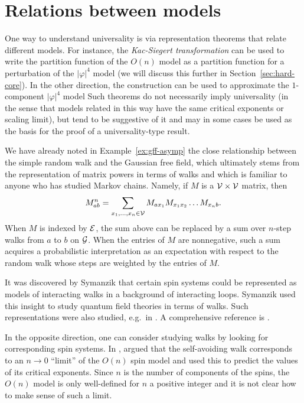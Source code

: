 \section{Relations between models}
\label{sec:spin-walk}

One way to understand universality is via representation theorems that relate
different models. For instance, the \emph{Kac-Siegert transformation}
can be used to write the partition function of the $O(n)$ model as a partition function
for a perturbation of the $|\varphi|^4$ model (we will discuss this further in
Section~\ref{sec:hard-core}). In the other direction, the
 construction \cite{SG73} can be used to approximate the $1$-component
$|\varphi|^4$ model 
Such theorems do not necessarily imply universality
(in the sense that models related in this way have the same critical exponents or
scaling limit), but tend to be suggestive of it and may in some cases
be used as the basis for the proof of a universality-type result.

We have already noted in Example~\ref{ex:gff-asymp} the close relationship between
the simple random walk
and the Gaussian free field, which ultimately stems from the representation of
matrix powers in terms of walks and which is familiar to anyone
who has studied Markov chains. Namely, if $M$ is a $\mathcal{V}\times\mathcal{V}$
matrix, then
\begin{equation}
M^n_{ab} = \sum_{x_1,\ldots,x_n\in\mathcal{V}} M_{ax_1} M_{x_1x_2} \ldots M_{x_nb}.
\end{equation}
When $M$ is indexed by $\mathcal{E}$, the
sum above can be replaced by a sum over $n$-step walks from $a$ to $b$ on $\mathcal{G}$.
When the entries of $M$ are nonnegative, such a sum acquires a probabilistic
interpretation as an expectation with respect to the random walk whose steps
are weighted by the entries of $M$.

It was discovered by Symanzik \cite{Syma69} that certain spin systems could be
represented as models of interacting walks in a background of interacting loops.
Symanzik used this insight to study quantum field theories in terms of walks.
Such representations were also studied, e.g.\ in \cite{BFS82,Dynk83}. A comprehensive
reference is \cite{FFS92}.

In the opposite direction, one can consider studying walks by looking for corresponding
spin systems. In \cite{Genn72},  argued that the self-avoiding walk
corresponds to an $n \to 0$ ``limit'' of the $O(n)$ spin model and used this
to predict the values of its critical exponents. Since $n$ is
the number of components of the spins, the $O(n)$ model is only well-defined
for $n$ a positive integer and it is not clear how to make sense of such a limit.

